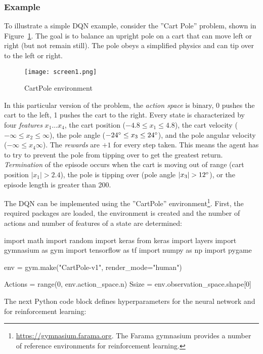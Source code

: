 \subsubsection*{Example}

To illustrate a simple DQN example, consider the ''Cart Pole'' problem, shown in Figure~\ref{fig:screen1_chap22}. The goal is to balance an upright pole on a cart that can move left or right (but not remain still). The pole obeys a simplified physics and can tip over to the left or right.

\begin{figure}
\centering
\texttt{[image: screen1.png]}
\caption{CartPole environment}
\label{fig:screen1_chap22}
\end{figure}

In this particular version of the problem, the \emph{action space} is binary, 0 pushes the cart to the left, 1 pushes the cart to the right. Every state is characterized by four \emph{features} $x_1 \ldots x_4$, the cart position ($-4.8 \leq x_1 \leq 4.8$), the cart velocity ($-\infty \leq x_2 \leq \infty$), the pole angle ($-24\degree \leq x_3 \leq 24\degree$), and the pole angular velocity ($-\infty \leq x_4 \infty$). The \emph{rewards} are $+1$ for every step taken. This means the agent has to try to prevent the pole from tipping over to get the greatest return. \emph{Termination} of the episode occurs when the cart is moving out of range (cart position $|x_1| > 2.4$), the pole is tipping over (pole angle $|x_3| > 12\degree$), or the episode length is greater than 200.

The DQN can be implemented using the ''CartPole'' environment\footnote{\url{https://gymnasium.farama.org}. The Farama gymnasium provides a number of reference environments for reinforcement learning.}. First, the required packages are loaded, the environment is created and the number of actions and number of features of a state are determined:

\begin{pythoncode}
import math
import random
import keras
from keras import layers
import gymnasium as gym
import tensorflow as tf
import numpy as np
import pygame

env = gym.make("CartPole-v1", render_mode="human")

Actions = range(0, env.action_space.n)
Ssize = env.observation_space.shape[0]
\end{pythoncode}

The next Python code block defines hyperparameters for the neural network and for reinforcement learning:

